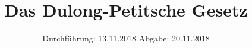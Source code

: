 

\subject{Nr.201}
\title{Das Dulong-Petitsche Gesetz}
\date{%
  Durchführung: 13.11.2018
  \hspace{3em}
  Abgabe: 20.11.2018
}



\maketitle
\thispagestyle{empty}
\tableofcontents
\newpage






\printbibliography{}


